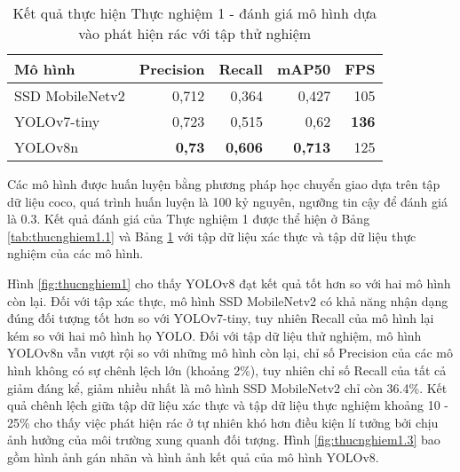 \documentclass[../the.tex]{subfiles}
\begin{document}
\begin{table}[h!]
    \centering
    \caption{Kết quả thực hiện Thực nghiệm 1 - đánh giá mô hình dựa vào phát hiện rác với tập thử nghiệm}
    \begin{tabular}{|l|r|r|r|r|}
        \hline
        \textbf{Mô hình} & \textbf{Precision} & \textbf{Recall} & \textbf{mAP50} & \multicolumn{1}{l|}{\textbf{FPS}} \\ \hline
        SSD MobileNetv2  & 0,712              & 0,364           & 0,427          & 105                               \\ \hline
        YOLOv7-tiny      & 0,723              & 0,515           & 0,62           & \textbf{136}                      \\ \hline
        YOLOv8n          & \textbf{0,73}      & \textbf{0,606}  & \textbf{0,713} & 125                               \\ \hline
    \end{tabular}
    \label{tab:thucnghiem1.2}
\end{table}

{\fontsize{13}{12} \selectfont

Các mô hình được huấn luyện bằng phương pháp học chuyển giao dựa trên tập dữ liệu coco, quá trình huấn luyện là 100 kỷ nguyên, ngưỡng tin cậy để đánh giá là 0.3.
Kết quả đánh giá của Thực nghiệm 1 được thể hiện ở Bảng \ref{tab:thucnghiem1.1}
và Bảng \ref{tab:thucnghiem1.2} với tập dữ liệu xác thực và tập dữ liệu thực nghiệm của các mô hình.

}

\bigskip

{\fontsize{13}{12} \selectfont

    Hình \ref{fig:thucnghiem1} cho thấy YOLOv8 đạt kết quả tốt hơn so với hai mô hình còn lại. Đối với tập xác thực, mô hình SSD MobileNetv2 có khả năng nhận dạng đúng đối tượng tốt hơn so với YOLOv7-tiny, tuy nhiên Recall của mô hình lại kém so với hai mô hình họ YOLO.
    Đối với tập dữ liệu thử nghiệm, mô hình YOLOv8n vẫn vượt rội so với những mô hình còn lại, chỉ số Precision của các mô hình không có sự chênh lệch lớn (khoảng 2\%), tuy nhiên chỉ số Recall của tất cả giảm đáng kể, giảm nhiều nhất là mô hình SSD MobileNetv2 chỉ còn 36.4\%.
    Kết quả chênh lệch giữa tập dữ liệu xác thực và tập dữ liệu thực nghiệm khoảng 10 - 25\% cho thấy việc phát hiện rác ở tự nhiên khó hơn điều kiện lí tưởng bởi chịu ảnh hưởng của môi trường xung quanh đối tượng.
    Hình \ref{fig:thucnghiem1.3} bao gồm hình ảnh gán nhãn và hình ảnh kết quả của mô hình YOLOv8.

}
\end{document}
